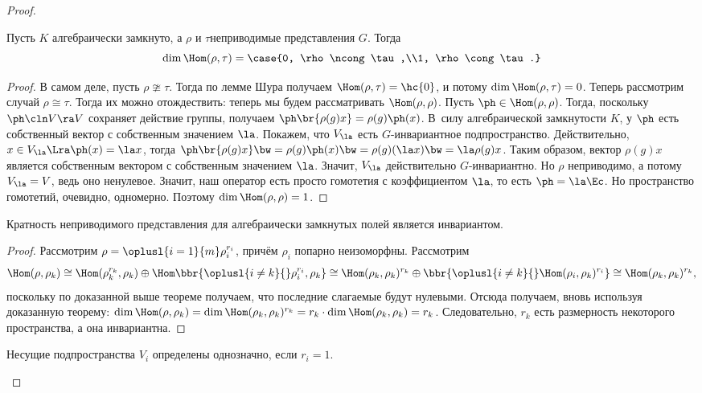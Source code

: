 \documentclass[a4paper]{article}
\begin{document}
\begin{proof}
\begin{theorem}
Пусть $K$ алгебраически замкнуто, а $\rho$ и $\tau$\т неприводимые представления $G$.
Тогда
$$\dim \Hom(\rho,\tau)=\case{0, \rho \ncong \tau,\\1, \rho \cong \tau.}$$
\end{theorem}
\begin{proof}
В самом деле, пусть $\rho \ncong \tau$. Тогда по лемме
Шура получаем $\Hom(\rho,\tau)=\hc{0}$, и потому $\dim
\Hom(\rho,\tau) = 0$. Теперь рассмотрим случай $\rho \cong \tau$.
Тогда их можно отождествить: теперь мы будем рассматривать
$\Hom(\rho,\rho)$. Пусть $\ph \in \Hom(\rho,\rho)$. Тогда,
поскольку $\ph\cln V \ra V$ сохраняет действие группы, получаем
$\ph\br{\rho(g)x}=\rho(g)\ph(x)$. В~силу алгебраической
замкнутости $K$, у $\ph$ есть собственный вектор с собственным
значением $\la$. Покажем, что $V_\la$ есть $G$-инвариантное
подпространство. Действительно, $x \in V_\la \Lra \ph(x)=\la x$,
тогда $\ph\br{\rho(g)x} \bw= \rho(g)\ph(x) \bw= \rho(g)(\la x) \bw= \la
\rho(g)x$. Таким образом, вектор $\rho(g)x$ является собственным
вектором с собственным значением $\la$. Значит, $V_\la$
действительно $G$-инвариантно. Но $\rho$ неприводимо, а потому
$V_\la = V$, ведь оно ненулевое. Значит, наш оператор есть просто
гомотетия с коэффициентом $\la$, то есть $\ph = \la \Ec$. Но пространство
гомотетий, очевидно, одномерно. Поэтому $\dim \Hom(\rho,\rho) =1$.
\end{proof}

\begin{imp}
Кратность неприводимого представления для алгебраически замкнутых полей является инвариантом.
\end{imp}
\begin{proof}
Рассмотрим $\rho = \oplusl{i=1}{m}\rho_i^{r_i}$, причём $\rho_i$ попарно неизоморфны.
Рассмотрим
$$
  \Hom(\rho,\rho_k)\cong\Hom(\rho_k^{r_k},\rho_k)\oplus
  \Hom\bbr{\oplusl{i\neq k}{}\rho_i^{r_i}, \rho_k}\cong
  \Hom(\rho_k,\rho_k)^{r_k}\oplus\bbr{\oplusl{i\neq k}{}\Hom(\rho_i,\rho_k)^{r_i}}\cong
  \Hom(\rho_k,\rho_k)^{r_k},
$$
поскольку по доказанной выше теореме получаем, что последние слагаемые будут
нулевыми. Отсюда получаем, вновь используя доказанную теорему: $\dim \Hom(\rho,\rho_k) = \dim
\Hom(\rho_k,\rho_k)^{r_k}= r_k \cdot \dim \Hom(\rho_k,\rho_k)= r_k$. Следовательно, $r_k$ есть размерность
некоторого пространства, а она инвариантна.
\end{proof}

\begin{note}
Несущие подпространства $V_i$ определены однозначно, если $r_i = 1$.
\end{note}


\end{proof}
\end{document}
